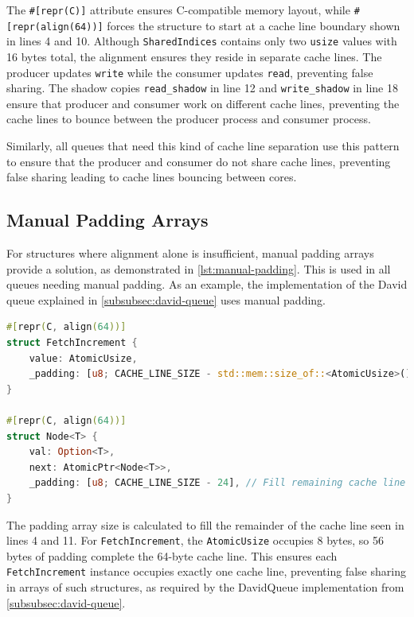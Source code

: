 The \texttt{\#[repr(C)]} attribute ensures C-compatible memory layout, while \newline \texttt{\#[repr(align(64))]} forces the structure to start at a cache line boundary shown in lines 4 and 10. Although \texttt{SharedIndices} contains only two \texttt{usize} values with 16 bytes total, the alignment ensures they reside in separate cache lines. The producer updates \texttt{write} while the consumer updates \texttt{read}, preventing false sharing. The shadow copies \texttt{read\_shadow} in line 12 and \texttt{write\_shadow} in line 18 ensure that producer and consumer work on different cache lines, preventing the cache lines to bounce between the producer process and consumer process.

Similarly, all queues that need this kind of cache line separation use this pattern to ensure that the producer and consumer do not share cache lines, preventing false sharing leading to cache lines bouncing between cores.

\subsection{Manual Padding Arrays}

For structures where alignment alone is insufficient, manual padding arrays provide a solution, as demonstrated in \cref{lst:manual-padding}. This is used in all queues needing manual padding. As an example, the implementation of the David queue explained in \cref{subsubsec:david-queue} uses manual padding.

\begin{lstlisting}[language=Rust, style=boxed, caption={Manual padding for exact cache line control}, label={lst:manual-padding}]
#[repr(C, align(64))]
struct FetchIncrement {
    value: AtomicUsize,
    _padding: [u8; CACHE_LINE_SIZE - std::mem::size_of::<AtomicUsize>()],
}

#[repr(C, align(64))]
struct Node<T> {
    val: Option<T>,
    next: AtomicPtr<Node<T>>,
    _padding: [u8; CACHE_LINE_SIZE - 24], // Fill remaining cache line
}
\end{lstlisting}

The padding array size is calculated to fill the remainder of the cache line seen in lines 4 and 11. For \texttt{FetchIncrement}, the \texttt{AtomicUsize} occupies 8 bytes, so 56 bytes of padding complete the 64-byte cache line. This ensures each \texttt{FetchIncrement} instance occupies exactly one cache line, preventing false sharing in arrays of such structures, as required by the DavidQueue implementation from \cref{subsubsec:david-queue}.

